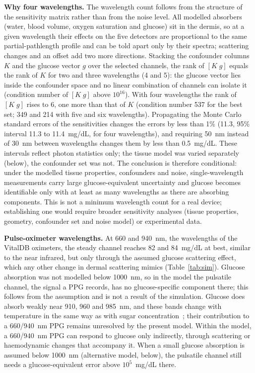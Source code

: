 \documentclass[11pt]{article}
\newcommand{\mgdl}{mg/dL}
\begin{document}
\textbf{Why four wavelengths.} The wavelength count follows from the structure of the sensitivity matrix rather than from the noise level. All modelled absorbers (water, blood volume, oxygen saturation and glucose) sit in the dermis, so at a given wavelength their effects on the five detectors are proportional to the same partial-pathlength profile and can be told apart only by their spectra; scattering changes and an offset add two more directions. Stacking the confounder columns $K$ and the glucose vector $g$ over the selected channels, the rank of $[K\;g]$ equals the rank of $K$ for two and three wavelengths (4 and 5): the glucose vector lies inside the confounder space and no linear combination of channels can isolate it (condition number of $[K\;g]$ above $10^{16}$). With four wavelengths the rank of $[K\;g]$ rises to 6, one more than that of $K$ (condition number 537 for the best set; 349 and 214 with five and six wavelengths). Propagating the Monte Carlo standard errors of the sensitivities changes the errors by less than 1\% (11.3, 95\% interval 11.3 to 11.4~\mgdl{}, for four wavelengths), and requiring 50~nm instead of 30~nm between wavelengths changes them by less than 0.5~\mgdl{}. These intervals reflect photon statistics only; the tissue model was varied separately (below), the confounder set was not. The conclusion is therefore conditional: under the modelled tissue properties, confounders and noise, single-wavelength measurements carry large glucose-equivalent uncertainty and glucose becomes identifiable only with at least as many wavelengths as there are absorbing components. This is not a minimum wavelength count for a real device; establishing one would require broader sensitivity analyses (tissue properties, geometry, confounder set and noise model) or experimental data.

\textbf{Pulse-oximeter wavelengths.} At 660 and 940~nm, the wavelengths of the VitalDB oximeters, the steady channel reaches 82 and 84~\mgdl{} at best, similar to the near infrared, but only through the assumed glucose scattering effect, which any other change in dermal scattering mimics (Table~\ref{tab:sim}). Glucose absorption was not modelled below 1000~nm, so in the model the pulsatile channel, the signal a PPG records, has no glucose-specific component there; this follows from the assumption and is not a result of the simulation. Glucose does absorb weakly near 910, 960 and 985~nm, and these bands change with temperature in the same way as with sugar concentration~\citep{golic2003}; their contribution to a 660/940~nm PPG remains unresolved by the present model. Within the model, a 660/940~nm PPG can respond to glucose only indirectly, through scattering or haemodynamic changes that accompany it. When a small glucose absorption is assumed below 1000~nm (alternative model, below), the pulsatile channel still needs a glucose-equivalent error above $10^5$~\mgdl{} there.
\end{document}

